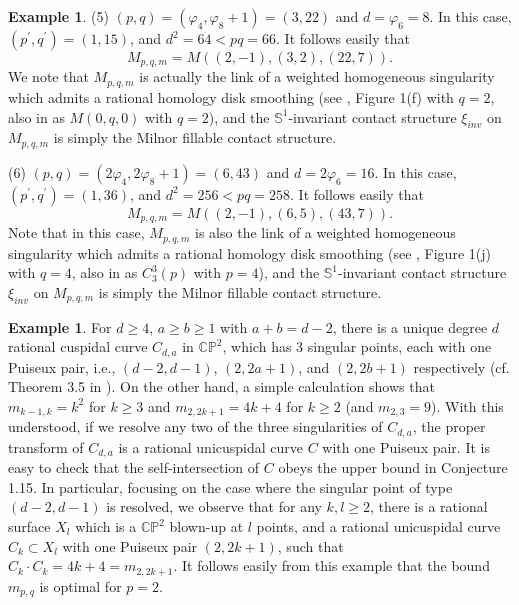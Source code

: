 \documentclass[11pt]{amsart}
\theoremstyle{plain}
\numberwithin{theorem}{section}
\theoremstyle{definition}
\newtheorem{example}[theorem]{Example}
\newcommand{\C}{{\mathbb C}}
\renewcommand{\P}{{\mathbb P}}
\newcommand{\s}{{\mathbb S}}
\begin{document}
\begin{example}
(5) $(p,q)=(\varphi_4,\varphi_8+1)=(3,22)$ and $d=\varphi_6=8$. In this case, 
$(p^\prime,q^\prime)=(1, 15)$, and $d^2=64<pq=66$. It follows easily that 
$$
M_{p,q,m}=M((2,-1), (3,2), (22,7)).
$$
We note that $M_{p,q,m}$ is actually the link of a weighted homogeneous singularity which admits a rational homology disk smoothing (see \cite{BS}, Figure 1(f) with $q=2$, also in \cite{W} as $M(0,q,0)$ with $q=2$), 
and the $\s^1$-invariant contact structure $\xi_{inv}$ on $M_{p,q,m}$ is
simply the Milnor fillable contact structure. 

(6) $(p,q)=(2\varphi_4,2\varphi_8+1)=(6, 43)$ and $d=2\varphi_6=16$. In this case, 
$(p^\prime,q^\prime)=(1, 36)$, and $d^2=256<pq=258$. It follows easily that 
$$
M_{p,q,m}=M((2,-1), (6,5), (43,7)).
$$
Note that in this case, $M_{p,q,m}$ is also the link of a weighted homogeneous singularity which admits a rational homology disk smoothing (see \cite{BS}, Figure 1(j) with $q=4$, also in \cite{W} as $C_3^3(p)$ with $p=4$), and 
the $\s^1$-invariant contact structure $\xi_{inv}$ on $M_{p,q,m}$ is simply the Milnor fillable contact structure. 
\end{example}

\begin{example}
For $d\geq 4$, $a\geq b\geq 1$ with $a+b=d-2$, there is a unique degree $d$ rational cuspidal curve $C_{d,a}$ in
$\C\P^2$, which has $3$ singular points, each with one Puiseux pair, i.e., $(d-2,d-1)$, $(2, 2a+1)$, and 
$(2,2b+1)$ respectively (cf. Theorem 3.5 in \cite{FZ}). On the other hand, a simple calculation shows that 
$m_{k-1,k}=k^2$ for $k\geq 3$ and $m_{2,2k+1}=4k+4$ for $k\geq 2$ (and $m_{2,3}=9$). With this understood, 
if we resolve any two of the three singularities of $C_{d,a}$, the proper transform of $C_{d,a}$ is a rational unicuspidal curve $C$ with one Puiseux pair. It is easy to check that the self-intersection of $C$ obeys the upper bound in Conjecture 1.15. In particular, focusing on the case where the singular point of type 
$(d-2,d-1)$ is resolved, we observe that for any $k,l \geq 2$, there is a rational surface $X_l$ which is a $\C\P^2$ blown-up at $l$ points, and a rational unicuspidal curve $C_{k}\subset X_l$ with one Puiseux pair $(2, 2k+1)$, 
such that $C_{k}\cdot C_{k}=4k+4=m_{2,2k+1}$. It follows easily from this example that the bound $m_{p,q}$ is optimal for $p=2$. 
\end{example}
\end{document}
